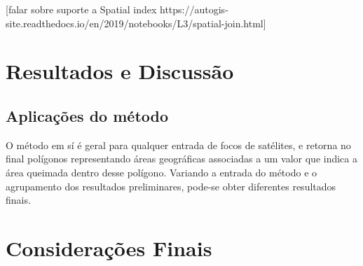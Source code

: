 \documentclass[cic,tc]{iiufrgs}
\begin{document}
[falar sobre suporte a Spatial index https://autogis-site.readthedocs.io/en/2019/notebooks/L3/spatial-join.html] \par



\chapter{Resultados e Discussão}

\section{Aplicações do método}

O método em sí é geral para qualquer entrada de focos de satélites, e retorna no final polígonos representando áreas geográficas associadas a um valor que indica a área queimada dentro desse polígono. Variando a entrada do método e o agrupamento dos resultados preliminares, pode-se obter diferentes resultados finais. \par



\chapter{Considerações Finais}





\end{document}
